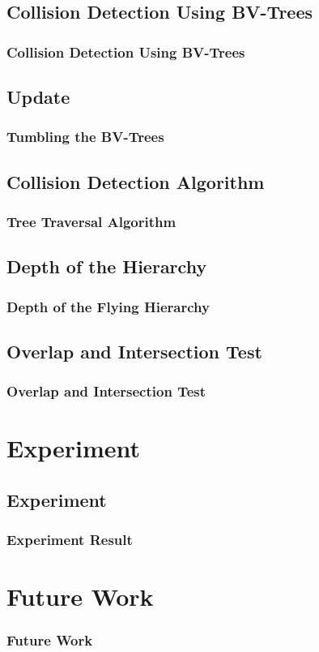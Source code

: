 \documentclass{beamer}
\begin{document}
\subsection{Collision Detection Using BV-Trees}
	\begin{frame}
	\frametitle{Collision Detection Using BV-Trees}
	\end{frame}

\subsection{Update}
	\begin{frame}
	\frametitle{Tumbling the BV-Trees}
	\end{frame}

\subsection{Collision Detection Algorithm}
	\begin{frame}
	\frametitle{Tree Traversal Algorithm}
	\end{frame}

\subsection{Depth of the Hierarchy}
	\begin{frame}
	\frametitle{Depth of the Flying Hierarchy}
	\end{frame}

\subsection{Overlap and Intersection Test}
	\begin{frame}
	\frametitle{Overlap and Intersection Test}
	\end{frame}

\section{Experiment}

\subsection{Experiment}
	\begin{frame}
	\frametitle{Experiment Result}
	\end{frame}

\section{Future Work}

\begin{frame}
\frametitle{Future Work}
\end{frame}
\end{document}
